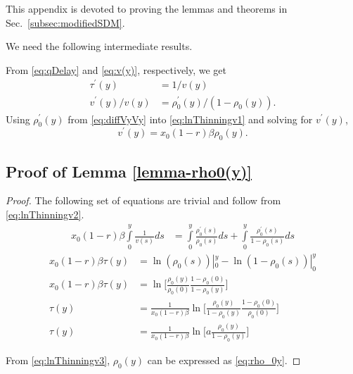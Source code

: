 \documentclass{IEEEtran}
\begin{document}
    


\newpage
    \appendix

     This appendix is devoted to proving the lemmas and theorems in Sec.~\ref{subsec:modifiedSDM}.

     We need the following intermediate results.

     From \eqref{eq:qDelay} and \eqref{eq:v(y)}, respectively, we get
       \begin{align}
            \tau^{'}(y) &= 1/v(y) \label{eq:diffTau} \\
            v^{'}(y)/v(y)&=\rho^{'}_0(y)/(1-\rho_0(y)). \label{eq:diffVyVy}
       \end{align}
     Using $\rho_0^{'}(y)$ from \eqref{eq:diffVyVy} into \eqref{eq:lnThinningv1} and solving for $v^{'}(y)$,
        \begin{equation}
            v^{'}(y)= x_0(1-r)\beta \rho_0(y). \label{eq:diffVy}
        \end{equation}

    \subsection*{Proof of Lemma \ref{lemma-rho0(y)}}
    \vspace{3mm}

    \begin{proof}
    The following set of equations are trivial and follow from \eqref{eq:lnThinningv2}.
    \begin{align}
         x_0(1-r) \beta \int\limits_{0}^y\frac{1}{v(s)}ds &=  \int\limits_{0}^y \frac{\rho_0^{'}(s)}{\rho_0(s)}ds+ \int\limits_{0}^y\frac{\rho_0^{'}(s)}{1-\rho_0(s)}ds \nonumber
    \end{align}
    \begin{align}
            x_0(1-r) \beta \tau(y) &= \ln(\rho_0(s))|_{0}^{y}-\ln(1-\rho_0(s))|_{0}^{y} \nonumber \\
            x_0(1-r)\beta \tau(y) &=\ln\bigg[\frac{\rho_0(y)}{\rho_0(0)}\frac{1-\rho_0(0)}{1-\rho_0(y)}\bigg] \nonumber \\
            \tau(y)&=\frac{1}{x_0(1-r)\beta} \ln\bigg[\frac{\rho_0(y)}{1-\rho_0(y)}\frac{1-\rho_0(0)}{\rho_0(0)}\bigg] \nonumber \\
            \tau(y)&= \frac{1}{x_0(1-r)\beta} \ln\bigg[a\frac{\rho_0(y)}{1-\rho_0(y)}\bigg] \label{eq:lnThinningv3}
    \end{align}

From \eqref{eq:lnThinningv3}, $\rho_0(y)$ can be expressed as \eqref{eq:rho_0y}.
\end{proof}
\end{document}

